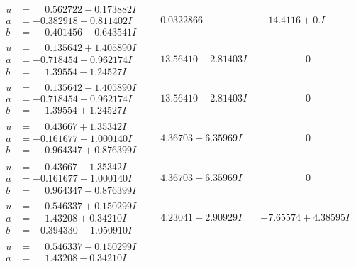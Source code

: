 \documentclass[1p]{elsarticle_modified}
\theoremstyle{definition}
\begin{document}
$$\begin{array}{c|c|c}
\begin{aligned}
u &= \phantom{-}0.562722 - 0.173882 I \\
a &= -0.382918 - 0.811402 I \\
b &= \phantom{-}0.401456 - 0.643541 I\end{aligned}
 & \phantom{-}0.0322866\phantom{ +0.000000I} & -14.4116 + 0. I\phantom{ +0.000000I} \\ \hline\begin{aligned}
u &= \phantom{-}0.135642 + 1.405890 I \\
a &= -0.718454 + 0.962174 I \\
b &= \phantom{-}1.39554 - 1.24527 I\end{aligned}
 & \phantom{-}13.56410 + 2.81403 I & \phantom{-0.000000 } 0 \\ \hline\begin{aligned}
u &= \phantom{-}0.135642 - 1.405890 I \\
a &= -0.718454 - 0.962174 I \\
b &= \phantom{-}1.39554 + 1.24527 I\end{aligned}
 & \phantom{-}13.56410 - 2.81403 I & \phantom{-0.000000 } 0 \\ \hline\begin{aligned}
u &= \phantom{-}0.43667 + 1.35342 I \\
a &= -0.161677 - 1.000140 I \\
b &= \phantom{-}0.964347 + 0.876399 I\end{aligned}
 & \phantom{-}4.36703 - 6.35969 I & \phantom{-0.000000 } 0 \\ \hline\begin{aligned}
u &= \phantom{-}0.43667 - 1.35342 I \\
a &= -0.161677 + 1.000140 I \\
b &= \phantom{-}0.964347 - 0.876399 I\end{aligned}
 & \phantom{-}4.36703 + 6.35969 I & \phantom{-0.000000 } 0 \\ \hline\begin{aligned}
u &= \phantom{-}0.546337 + 0.150299 I \\
a &= \phantom{-}1.43208 + 0.34210 I \\
b &= -0.394330 + 1.050910 I\end{aligned}
 & \phantom{-}4.23041 - 2.90929 I & -7.65574 + 4.38595 I \\ \hline\begin{aligned}
u &= \phantom{-}0.546337 - 0.150299 I \\
a &= \phantom{-}1.43208 - 0.34210 I \\

\end{aligned}
\end{array}$$
\end{document}
